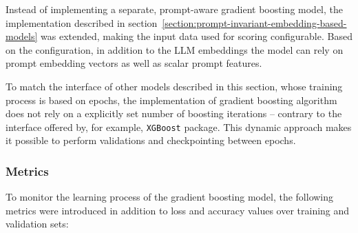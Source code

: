 \documentclass[a4paper,11pt,twoside]{report}
\theoremstyle{definition}
\begin{document}
Instead of implementing a separate, prompt-aware gradient boosting model, the implementation described in section~\ref{section:prompt-invariant-embedding-based-models} was extended, making the input data used for scoring configurable. Based on the configuration, in addition to the LLM embeddings the model can rely on prompt embedding vectors as well as scalar prompt features.

To match the interface of other models described in this section, whose training process is based on epochs, the implementation of gradient boosting algorithm does not rely on a explicitly set number of boosting iterations -- contrary to the interface offered by, for example, \texttt{XGBoost} package. This dynamic approach makes it possible to perform validations and checkpointing between epochs.

\subsubsection{Metrics}
\label{equation:scoring-gb-metrics}

To monitor the learning process of the gradient boosting model, the following metrics were introduced in addition to loss and accuracy values over training and validation sets:
\end{document}
